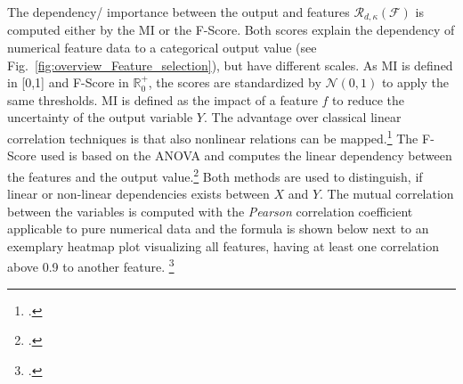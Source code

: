 The dependency/ importance between the output and features $\mathcal{R}_{d,\kappa}(\mathcal{F})$ is computed either by the
\gls{MI} or the \gls{F-Score}. Both scores explain the dependency of numerical feature data to a categorical output value (see Fig.~\ref{fig:overview_Feature_selection}),
but have different scales. As \gls{MI} is defined in [0,1] and \gls{F-Score} in $\mathbb{R}_0^+$, the scores are standardized by $\mathcal{N}(0,1)$ to
apply the same thresholds. \gls{MI} is defined as the impact of a feature $f$ to reduce the uncertainty of the output variable $Y$.
The advantage over classical linear correlation techniques is that also nonlinear relations can be mapped.\footcite[cf.][pp.539-539]{battiti_using_1994}
The \gls{F-Score} used is based on the \gls{ANOVA} and computes the linear dependency between the features and the output value.\footcite[cf.][p.2]{gu_generalized_2012}
Both methods are used to distinguish, if linear or non-linear dependencies exists between $X$ and $Y$. The mutual correlation between the variables
is computed with the \textit{Pearson} correlation coefficient applicable to pure numerical data and the formula is shown below
next to an exemplary heatmap plot visualizing all features, having at least one correlation above 0.9 to another feature. \footcite[cf.][p.17]{chandrashekar_survey_2014}
